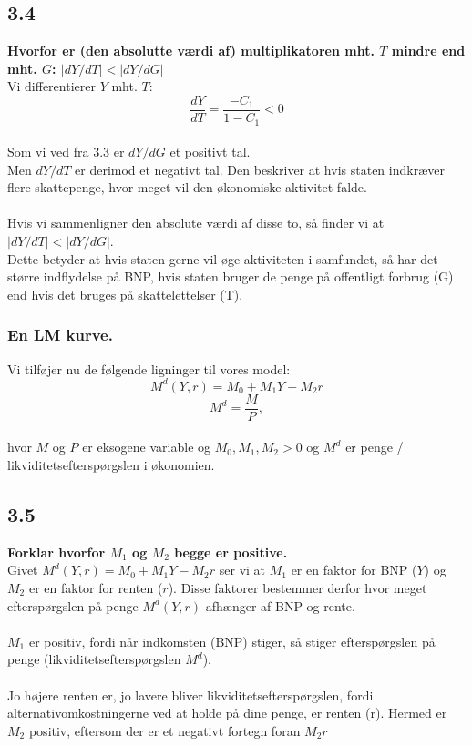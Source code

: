 \documentclass[a4paper, 12pt]{article}
\begin{document}
\subsection*{3.4}
\textbf{Hvorfor er (den absolutte værdi af) multiplikatoren mht. $T$ mindre end mht. $G$: $| dY/dT | < | dY/dG |$}
\\
Vi differentierer $Y$ mht. $T$:
 $$\dfrac{dY}{dT} = \dfrac{-C_{1}}{1 - C_{1}} < 0$$
\\
Som vi ved fra 3.3 er $dY/dG$ et positivt tal.
\\
Men $dY/dT$ er derimod et negativt tal. Den beskriver at hvis staten indkræver flere skattepenge, hvor meget vil  den økonomiske aktivitet falde.
\\\\
Hvis vi sammenligner den absolute værdi af disse to, så finder vi at $| dY/dT | < | dY/dG |$.
\\
Dette betyder at hvis staten gerne vil øge aktiviteten i samfundet, så har det større indflydelse på BNP, hvis staten bruger de penge på offentligt forbrug (G) end hvis det bruges på skattelettelser (T).

\subsubsection*{En LM kurve.}
Vi tilføjer nu de følgende ligninger til vores model:
$$M^{d}(Y,r) = M_{0}+M_{1}Y - M_{2}r$$
$$M^{d} = \dfrac{M}{P},$$
\\
hvor $M$ og $P$ er eksogene variable og $M_{0}, M_{1}, M_{2} > 0$ og $M^{d}$ er penge / likviditetsefterspørgslen i økonomien.

\subsection*{3.5}
\textbf{Forklar hvorfor $M_{1}$ og $M_{2}$ begge er positive.}
\\
Givet $M^{d}(Y,r) = M_{0}+M_{1}Y - M_{2}r$ ser vi at $M_{1}$ er en faktor for BNP ($Y$) og $M_{2}$ er en faktor for renten ($r$). Disse faktorer bestemmer derfor hvor meget efterspørgslen på penge $M^{d}(Y,r)$ afhænger af BNP og rente.
\\\\
$M_{1}$ er positiv, fordi når indkomsten (BNP) stiger, så stiger efterspørgslen på penge (likviditetsefterspørgslen $M^{d}$).
\\\\
Jo højere renten er, jo lavere bliver likviditetsefterspørgslen, fordi alternativomkostningerne ved at holde på dine penge, er renten (r). Hermed er $M_{2}$ positiv, eftersom der er et negativt fortegn foran $M_{2}r$
\\
\end{document}
